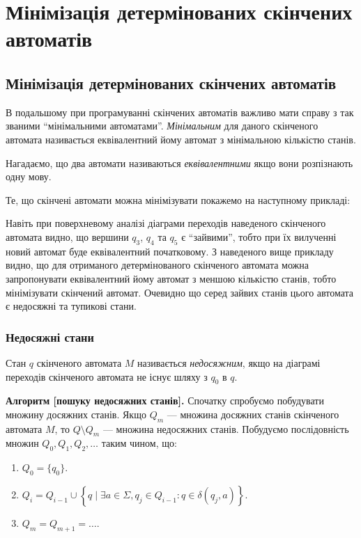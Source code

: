 \setcounter{section}{2}

\section{Мінімізація детермінованих скінчених автоматів}

\subsection{Мінімізація детермінованих скінчених автоматів}

В подальшому при програмуванні скінчених автоматів важливо мати справу з так званими  ``мінімальними автоматами''. \textit{Мінімальним} для даного скінченого автомата називається еквівалентний йому автомат з мінімальною кількістю станів. \medskip

Нагадаємо, що два автомати називаються \textit{еквівалентними} якщо вони розпізнають одну мову. \medskip

Те, що скінчені автомати можна мінімізувати покажемо на наступному прикладі:
\begin{figure}[H]
	\centering
	
\end{figure}

Навіть при поверхневому аналізі діаграми переходів наведеного скінченого автомата видно, що вершини $q_3$, $q_4$ та $q_5$ є ``зайвими'', тобто при їх вилученні новий автомат буде еквівалентний початковому. З наведеного вище прикладу видно, що для отриманого детермінованого скінченого автомата можна запропонувати еквівалентний йому автомат з меншою кількістю станів, тобто мінімізувати скінчений автомат. Очевидно що серед зайвих станів цього автомата є недосяжні та тупикові стани.

\subsubsection{Недосяжні стани}

Стан $q$ скінченого автомата $M$ називається \textit{недосяжним}, якщо на діаграмі переходів скінченого автомата не існує шляху з $q_0$ в $q$. \medskip

\textbf{Алгоритм [пошуку недосяжних станів].} Спочатку спробуємо побудувати множину досяжних станів. Якщо $Q_m$ --- множина досяжних станів скінченого автомата $M$, то $Q \setminus Q_m$ --- множина недосяжних станів. Побудуємо послідовність множин $Q_0, Q_1, Q_2, \ldots$ таким чином, що:
\begin{enumerate}
	\item $Q_0 = \{q_0\}$.
	\item $Q_i = Q_{i-1} \cup \left\{ q \mid \exists a \in \Sigma, q_j \in Q_{i - 1}: q \in \delta(q_j, a) \right\}$.
	\item $Q_m = Q_{m+1} = \ldots$.
\end{enumerate}

